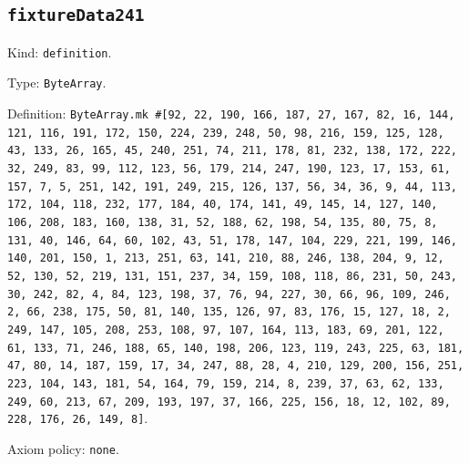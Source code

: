 \documentclass[11pt]{article}
\begin{document}
\subsection*{\texttt{fixtureData241}}
\noindent Kind: \texttt{definition}.\par
\noindent Type: \texttt{ByteArray}.\par
\noindent Definition: \texttt{ByteArray.mk \#[92, 22, 190, 166, 187, 27, 167, 82, 16, 144, 121, 116, 191, 172, 150, 224, 239, 248, 50, 98, 216, 159, 125, 128, 43, 133, 26, 165, 45, 240, 251, 74, 211, 178, 81, 232, 138, 172, 222, 32, 249, 83, 99, 112, 123, 56, 179, 214, 247, 190, 123, 17, 153, 61, 157, 7, 5, 251, 142, 191, 249, 215, 126, 137, 56, 34, 36, 9, 44, 113, 172, 104, 118, 232, 177, 184, 40, 174, 141, 49, 145, 14, 127, 140, 106, 208, 183, 160, 138, 31, 52, 188, 62, 198, 54, 135, 80, 75, 8, 131, 40, 146, 64, 60, 102, 43, 51, 178, 147, 104, 229, 221, 199, 146, 140, 201, 150, 1, 213, 251, 63, 141, 210, 88, 246, 138, 204, 9, 12, 52, 130, 52, 219, 131, 151, 237, 34, 159, 108, 118, 86, 231, 50, 243, 30, 242, 82, 4, 84, 123, 198, 37, 76, 94, 227, 30, 66, 96, 109, 246, 2, 66, 238, 175, 50, 81, 140, 135, 126, 97, 83, 176, 15, 127, 18, 2, 249, 147, 105, 208, 253, 108, 97, 107, 164, 113, 183, 69, 201, 122, 61, 133, 71, 246, 188, 65, 140, 198, 206, 123, 119, 243, 225, 63, 181, 47, 80, 14, 187, 159, 17, 34, 247, 88, 28, 4, 210, 129, 200, 156, 251, 223, 104, 143, 181, 54, 164, 79, 159, 214, 8, 239, 37, 63, 62, 133, 249, 60, 213, 67, 209, 193, 197, 37, 166, 225, 156, 18, 12, 102, 89, 228, 176, 26, 149, 8]}.\par
\noindent Axiom policy: \texttt{none}.\par
\end{document}
